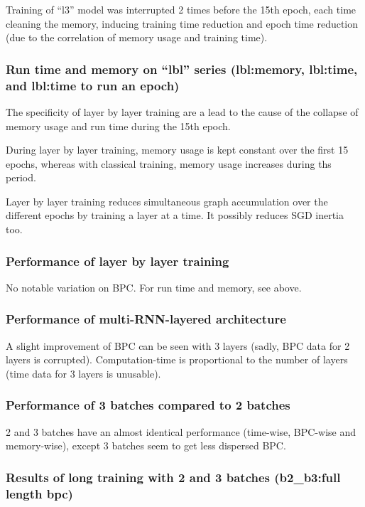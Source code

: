 Training of ``l3'' model was interrupted 2 times before the 15th epoch,
each time cleaning the memory, inducing training time reduction and
epoch time reduction (due to the correlation of memory usage and
training time).

\subsubsection{\texorpdfstring{Run time and memory on ``lbl'' series
(lbl:memory, lbl:time, and lbl:time to run an
epoch)}{Run time and memory on lbl series (lbl:memory, lbl:time, and lbl:time to run an epoch)}}

The specificity of layer by layer training are a lead to the cause of
the collapse of memory usage and run time during the 15th epoch.

During layer by layer training, memory usage is kept constant over the
first 15 epochs, whereas with classical training, memory usage increases
during ths period.

Layer by layer training reduces simultaneous graph accumulation over the
different epochs by training a layer at a time. It possibly reduces SGD
inertia too.

\subsubsection{Performance of layer by layer
training}

No notable variation on BPC. For run time and memory, see above.

\subsubsection{Performance of multi-RNN-layered
architecture}

A slight improvement of BPC can be seen with 3 layers (sadly, BPC data
for 2 layers is corrupted). Computation-time is proportional to the
number of layers (time data for 3 layers is unusable).

\subsubsection{Performance of 3 batches compared to 2
batches}

2 and 3 batches have an almost identical performance (time-wise,
BPC-wise and memory-wise), except 3 batches seem to get less dispersed
BPC.

\subsubsection{Results of long training with 2 and 3 batches
(b2\_b3:full length
bpc)}

